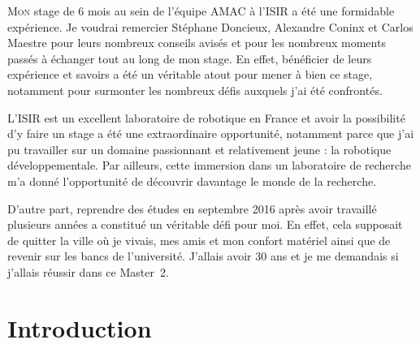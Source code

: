 \documentclass[draft]{llncs}
\begin{document}
\lettrine{M}{on} stage de 6 mois au sein de l'équipe AMAC à l'ISIR a été une formidable expérience.
Je voudrai remercier Stéphane Doncieux, Alexandre Coninx et Carlos Maestre pour leurs nombreux conseils avisés et pour les nombreux moments passés à échanger tout au long de mon stage.
En effet, bénéficier de leurs expérience et savoirs a été un véritable atout pour mener à bien ce stage, notamment pour surmonter les nombreux défis auxquels j'ai été confrontés.

L'ISIR est un excellent laboratoire de robotique en France et avoir la possibilité d'y faire un stage a été une extraordinaire opportunité, notamment parce que j'ai pu travailler sur un domaine passionnant et relativement jeune : la robotique développementale.
Par ailleurs, cette immersion dans un laboratoire de recherche m'a donné l'opportunité de découvrir davantage le monde de la recherche.

D'autre part, reprendre des études en septembre 2016 après avoir travaillé plusieurs années a constitué un véritable défi pour moi.
En effet, cela supposait de quitter la ville où je vivais, mes amis et mon confort matériel ainsi que de revenir sur les bancs de l'université.
J'allais avoir 30 ans et je me demandais si j'allais réussir dans ce Master~2.


\newpage

\section{Introduction}





\end{document}
